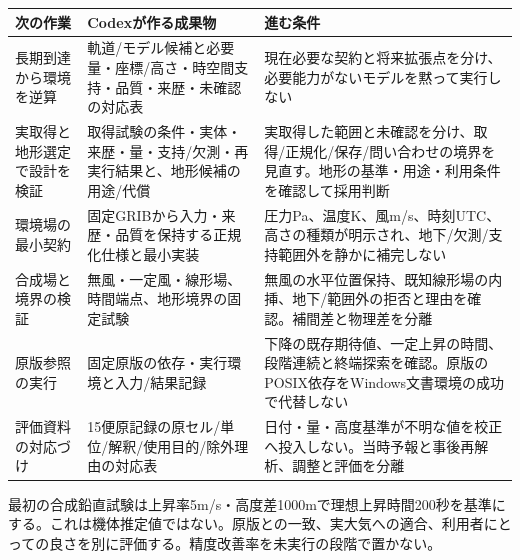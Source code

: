 \documentclass[11pt,a4paper]{article}
\newcounter{none}
\begin{document}
{\def\LTcaptype{none} %
\begin{longtable}[]{@{}
  >{\raggedright\arraybackslash}p{}
  >{\raggedright\arraybackslash}p{}
  >{\raggedright\arraybackslash}p{}@{}}
\toprule\noalign{}
\begin{minipage}[b]{\linewidth}\raggedright
次の作業
\end{minipage} & \begin{minipage}[b]{\linewidth}\raggedright
Codexが作る成果物
\end{minipage} & \begin{minipage}[b]{\linewidth}\raggedright
進む条件
\end{minipage} \\
\midrule\noalign{}
\endhead
\bottomrule\noalign{}
\endlastfoot
長期到達から環境を逆算 &
軌道/モデル候補と必要量・座標/高さ・時空間支持・品質・来歴・未確認の対応表
&
現在必要な契約と将来拡張点を分け、必要能力がないモデルを黙って実行しない \\
実取得と地形選定で設計を検証 &
取得試験の条件・実体・来歴・量・支持/欠測・再実行結果と、地形候補の用途/代償
&
実取得した範囲と未確認を分け、取得/正規化/保存/問い合わせの境界を見直す。地形の基準・用途・利用条件を確認して採用判断 \\
環境場の最小契約 &
固定GRIBから入力・来歴・品質を保持する正規化仕様と最小実装 &
圧力Pa、温度K、風m/s、時刻UTC、高さの種類が明示され、地下/欠測/支持範囲外を静かに補完しない \\
合成場と境界の検証 & 無風・一定風・線形場、時間端点、地形境界の固定試験
&
無風の水平位置保持、既知線形場の内挿、地下/範囲外の拒否と理由を確認。補間差と物理差を分離 \\
原版参照の実行 & 固定原版の依存・実行環境と入力/結果記録 &
下降の既存期待値、一定上昇の時間、段階連続と終端探索を確認。原版のPOSIX依存をWindows文書環境の成功で代替しない \\
評価資料の対応づけ &
15便原記録の原セル/単位/解釈/使用目的/除外理由の対応表 &
日付・量・高度基準が不明な値を校正へ投入しない。当時予報と事後再解析、調整と評価を分離 \\
\end{longtable}
}

最初の合成鉛直試験は上昇率5m/s・高度差1000mで理想上昇時間200秒を基準にする。これは機体推定値ではない。原版との一致、実大気への適合、利用者にとっての良さを別に評価する。精度改善率を未実行の段階で置かない。
\end{document}
